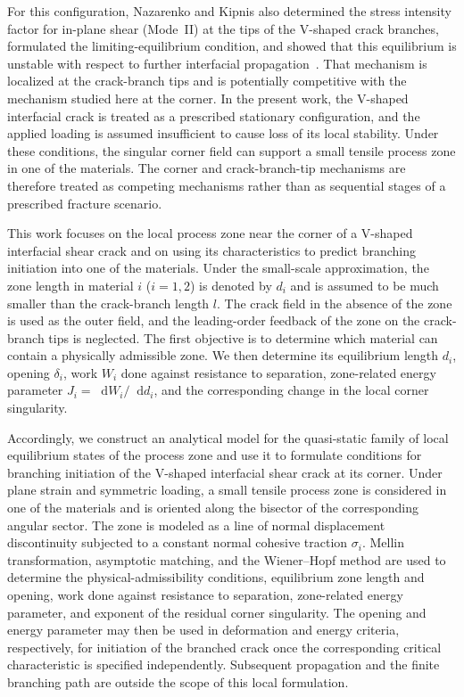 \documentclass[pdflatex,onecolumn,sn-mathphys-ay]{sn-jnl}
\newcommand{\dd}{\mathop{}\!\mathrm{d}}
\begin{document}
For this configuration, Nazarenko and Kipnis also determined the stress
intensity factor for in-plane shear (Mode~II) at the tips of the
V-shaped crack branches, formulated the limiting-equilibrium condition, and showed
that this equilibrium is unstable with respect to further interfacial
propagation~\citeyearpar{NazarenkoKipnis2022Equilibrium}. That mechanism is localized
at the crack-branch tips and is potentially competitive with the mechanism studied
here at the corner. In the present work, the V-shaped interfacial crack is
treated as a prescribed stationary configuration, and the applied loading is
assumed insufficient to cause loss of its local stability. Under these
conditions, the singular corner field can support a small tensile process
zone in one of the materials. The corner and crack-branch-tip mechanisms are
therefore treated as competing mechanisms rather than as sequential stages
of a prescribed fracture scenario.

This work focuses on the local process zone near the corner of a V-shaped
interfacial shear crack and on using its characteristics to predict
branching initiation into one of the materials. Under the small-scale
approximation, the zone length in material $i$ ($i=1,2$) is denoted by $d_i$
and is assumed to be much smaller than the crack-branch length $l$. The crack field in the absence of the zone is used as the outer field, and
the leading-order feedback of the zone on the crack-branch tips is neglected.
The first objective is to determine which material can contain a physically
admissible zone. We then determine its equilibrium length $d_i$, opening
$\delta_i$, work $W_i$ done against resistance to separation, zone-related
energy parameter $J_i=\dd W_i/\dd d_i$, and the corresponding change in the
local corner singularity.

Accordingly, we construct an analytical model for the quasi-static family of
local equilibrium states of the process zone and use it to formulate
conditions for branching initiation of the V-shaped interfacial shear crack
at its corner. Under plane strain and symmetric loading, a small tensile
process zone is considered in one of the materials and is oriented along the
bisector of the corresponding angular sector. The zone is modeled as a line
of normal displacement discontinuity subjected to a constant normal cohesive
traction $\sigma_i$. Mellin transformation, asymptotic matching, and the Wiener--Hopf method are
used to determine the physical-admissibility conditions, equilibrium zone
length and opening, work done against resistance to separation, zone-related
energy parameter, and exponent of the residual corner singularity. The opening
and energy parameter may then be used in deformation and energy criteria,
respectively, for initiation of the branched crack once the corresponding
critical characteristic is specified independently. Subsequent propagation and the finite branching path
are outside the scope of this local formulation.
\end{document}
